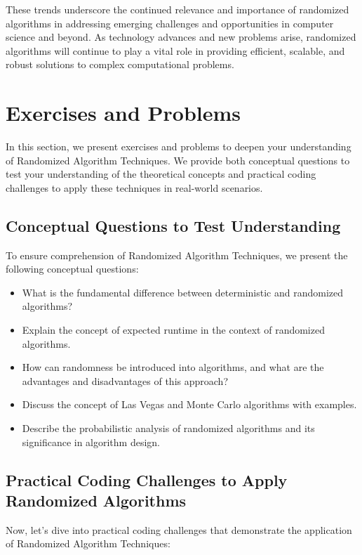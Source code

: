 \documentclass[12pt]{book} %
\begin{document}
These trends underscore the continued relevance and importance of randomized algorithms in addressing emerging challenges and opportunities in computer science and beyond. As technology advances and new problems arise, randomized algorithms will continue to play a vital role in providing efficient, scalable, and robust solutions to complex computational problems.


\section{Exercises and Problems}

In this section, we present exercises and problems to deepen your understanding of Randomized Algorithm Techniques. We provide both conceptual questions to test your understanding of the theoretical concepts and practical coding challenges to apply these techniques in real-world scenarios.

\subsection{Conceptual Questions to Test Understanding}

To ensure comprehension of Randomized Algorithm Techniques, we present the following conceptual questions:

\begin{itemize}
    \item What is the fundamental difference between deterministic and randomized algorithms?
    \item Explain the concept of expected runtime in the context of randomized algorithms.
    \item How can randomness be introduced into algorithms, and what are the advantages and disadvantages of this approach?
    \item Discuss the concept of Las Vegas and Monte Carlo algorithms with examples.
    \item Describe the probabilistic analysis of randomized algorithms and its significance in algorithm design.
\end{itemize}

\subsection{Practical Coding Challenges to Apply Randomized Algorithms}

Now, let's dive into practical coding challenges that demonstrate the application of Randomized Algorithm Techniques:
\end{document}
